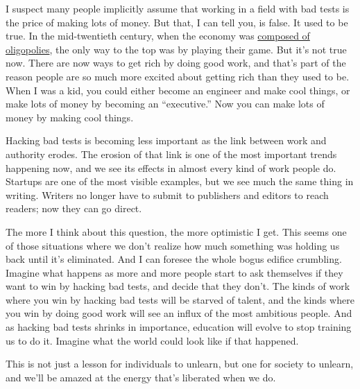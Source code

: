 \documentclass[12pt]{book}
\begin{document}
I suspect many people implicitly assume that working in a field with bad
tests is the price of making lots of money. But that, I can tell you, is
false. It used to be true. In the mid-twentieth century, when the
economy was \href{re.html}{composed of oligopolies}, the only way to the
top was by playing their game. But it's not true now. There are now ways
to get rich by doing good work, and that's part of the reason people are
so much more excited about getting rich than they used to be. When I was
a kid, you could either become an engineer and make cool things, or make
lots of money by becoming an ``executive.'' Now you can make lots of
money by making cool things.

Hacking bad tests is becoming less important as the link between work
and authority erodes. The erosion of that link is one of the most
important trends happening now, and we see its effects in almost every
kind of work people do. Startups are one of the most visible examples,
but we see much the same thing in writing. Writers no longer have to
submit to publishers and editors to reach readers; now they can go
direct.

The more I think about this question, the more optimistic I get. This
seems one of those situations where we don't realize how much something
was holding us back until it's eliminated. And I can foresee the whole
bogus edifice crumbling. Imagine what happens as more and more people
start to ask themselves if they want to win by hacking bad tests, and
decide that they don't. The kinds of work where you win by hacking bad
tests will be starved of talent, and the kinds where you win by doing
good work will see an influx of the most ambitious people. And as
hacking bad tests shrinks in importance, education will evolve to stop
training us to do it. Imagine what the world could look like if that
happened.

This is not just a lesson for individuals to unlearn, but one for
society to unlearn, and we'll be amazed at the energy that's liberated
when we do.
\end{document}
